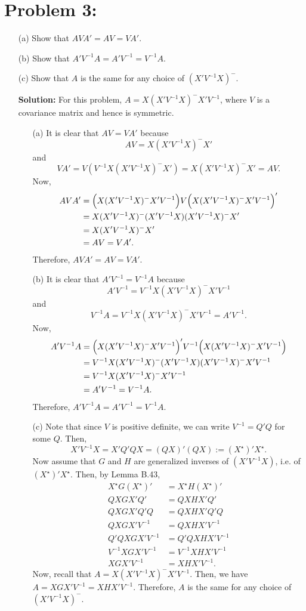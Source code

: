 \documentclass[11pt]{article}
\begin{document}
\section*{Problem 3:}
\begin{itemize}
\item[(a)] Show that $AVA' = AV = VA'$.
\item[(b)] Show that $A'V^{-1}A = A'V^{-1} = V^{-1}A$.
\item[(c)] Show that $A$ is the same for any choice of $(X'V^{-1}X)^-$.
\end{itemize}
\begin{itemize}
\item[] {\bf Solution:}  For this problem, $A = X(X'V^{-1}X)^-X'V^{-1}$, where $V$ is a covariance matrix and hence is symmetric.
\begin{itemize}
\item[(a)]  It is clear that $AV = VA'$ because
\[
AV = X(X'V^{-1}X)^-X'
\]
and
\[
VA' = V(V^{-1} X(X'V^{-1}X)^-X') = X(X'V^{-1}X)^-X' = AV.
\]
Now,
\begin{align*}
AVA' &= \Big{(}X(X'V^{-1}X)^-X'V^{-1}\Big{)}V\Big{(}X(X'V^{-1}X)^-X'V^{-1}\Big{)}' \\
&= X(X'V^{-1}X)^-(X'V^{-1}X)(X'V^{-1}X)^-X' \\
&= X(X'V^{-1}X)^-X' \\
&= AV = VA'.
\end{align*}
Therefore, $AVA' = AV = VA'$.
\item[(b)]  It is clear that $A'V^{-1} = V^{-1}A$ because
\[
A'V^{-1} = V^{-1}X(X'V^{-1}X)^-X'V^{-1}
\]
and
\[
V^{-1}A = V^{-1}X(X'V^{-1}X)^-X'V^{-1} = A'V^{-1}.
\]
Now,
\begin{align*}
A'V^{-1}A &= \Big{(}X(X'V^{-1}X)^-X'V^{-1}\Big{)}'V^{-1}\Big{(}X(X'V^{-1}X)^-X'V^{-1}\Big{)} \\
&= V^{-1}X(X'V^{-1}X)^-(X'V^{-1}X)(X'V^{-1}X)^-X'V^{-1} \\
&= V^{-1}X(X'V^{-1}X)^-X'V^{-1} \\
&= A'V^{-1} = V^{-1}A.
\end{align*}
Therefore, $A'V^{-1}A = A'V^{-1} = V^{-1}A$.
\newpage
\item[(c)]  Note that since $V$ is positive definite, we can write $V^{-1} = Q'Q$ for some $Q$.  Then, 
\[
X'V^{-1}X = X'Q'QX = (QX)'(QX) := (X^{\star})' X^\star.
\]
Now assume that $G$ and $H$ are generalized inverses of $(X'V^{-1}X)$, i.e. of $(X^{\star})' X^\star$.  Then, by Lemma B.43,
\begin{align*}
X^\star G (X^\star)' &= X^\star H (X^\star)' \\
QXGX'Q' &= QXHX'Q' \\
QXGX'Q'Q &= QXHX'Q'Q \\
QXGX'V^{-1} &= QXHX'V^{-1} \\
Q'QXGX'V^{-1} &= Q'QXHX'V^{-1} \\
V^{-1}XGX'V^{-1} &= V^{-1}XHX'V^{-1} \\
XGX'V^{-1} &= XHX'V^{-1}.
\end{align*}
Now, recall that $A = X(X'V^{-1}X)^-X'V^{-1}$.  Then, we have $A = XGX'V^{-1} = XHX'V^{-1}$.  Therefore, $A$ is the same for any choice of $(X'V^{-1}X)^-$.
\end{itemize}
\end{itemize}
\end{document}
